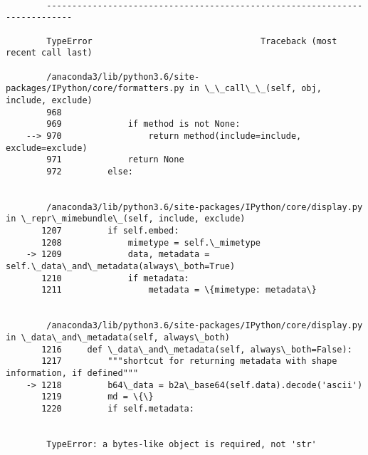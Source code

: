 \documentclass[11pt]{article}
\begin{document}
    \begin{Verbatim}[commandchars=\\\{\}]

        ---------------------------------------------------------------------------

        TypeError                                 Traceback (most recent call last)

        /anaconda3/lib/python3.6/site-packages/IPython/core/formatters.py in \_\_call\_\_(self, obj, include, exclude)
        968 
        969             if method is not None:
    --> 970                 return method(include=include, exclude=exclude)
        971             return None
        972         else:


        /anaconda3/lib/python3.6/site-packages/IPython/core/display.py in \_repr\_mimebundle\_(self, include, exclude)
       1207         if self.embed:
       1208             mimetype = self.\_mimetype
    -> 1209             data, metadata = self.\_data\_and\_metadata(always\_both=True)
       1210             if metadata:
       1211                 metadata = \{mimetype: metadata\}


        /anaconda3/lib/python3.6/site-packages/IPython/core/display.py in \_data\_and\_metadata(self, always\_both)
       1216     def \_data\_and\_metadata(self, always\_both=False):
       1217         """shortcut for returning metadata with shape information, if defined"""
    -> 1218         b64\_data = b2a\_base64(self.data).decode('ascii')
       1219         md = \{\}
       1220         if self.metadata:


        TypeError: a bytes-like object is required, not 'str'

    \end{Verbatim}
\end{document}
